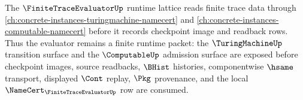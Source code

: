 The $\FiniteTraceEvaluatorUp$ runtime lattice reads finite trace data through
\autoref{ch:concrete-instances-turingmachine-namecert} and
\autoref{ch:concrete-instances-computable-namecert} before it records checkpoint
image and readback rows. Thus the evaluator remains a finite runtime packet:
the $\TuringMachineUp$ transition surface and the $\ComputableUp$ admission
surface are exposed before checkpoint images, source readbacks, $\BHist$
histories, componentwise $\hsame$ transport, displayed $\Cont$ replay, $\Pkg$
provenance, and the local $\NameCert_{\FiniteTraceEvaluatorUp}$ row are
consumed.
